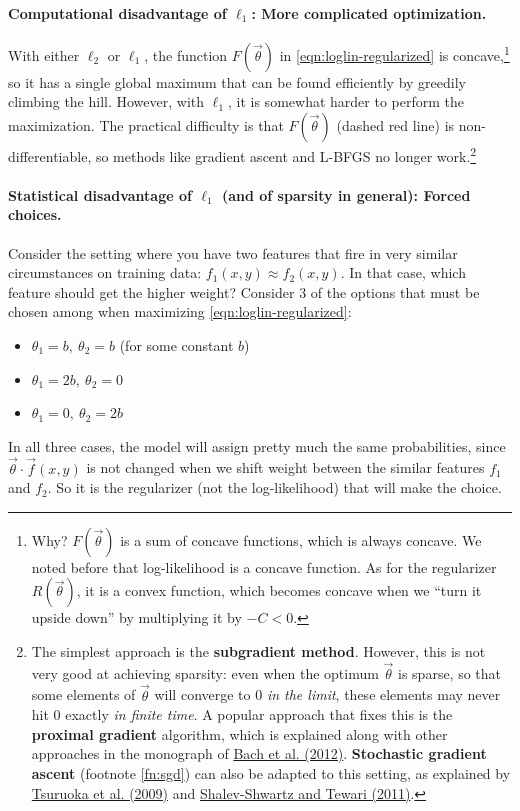 \documentclass[11pt]{article}
\newcommand{\vtheta}{\vec{\theta}}
\begin{document}
\paragraph{Computational disadvantage of $\ell_1$: More complicated optimization.}
With either $\ell_2$ or $\ell_1$, the function $F(\vtheta)$ in \eqref{eqn:loglin-regularized} is concave,\footnote{Why?  $F(\vtheta)$ is a sum of concave functions, which is always concave.  We noted before that log-likelihood is a concave function.  As for the regularizer $R(\vtheta)$, it is a convex function, which becomes concave when we ``turn it upside down'' by multiplying it by $-C < 0$.} so it has a single global maximum that can be found efficiently by greedily climbing the hill.  However, with $\ell_1$, it is somewhat harder to perform the maximization.  The practical difficulty is that $F(\vtheta)$ (dashed red line) is non-differentiable, so methods like gradient ascent and L-BFGS no longer work.\footnote{The simplest approach is the {\bf subgradient method}.  However, this is not very good at achieving sparsity: even when the optimum $\vtheta$ is sparse, so that some elements of $\vtheta$ will converge to 0 {\em in the limit}, these elements may never hit 0 exactly {\em in finite time}.  A popular approach that fixes this is the {\bf proximal gradient} algorithm, which is explained along with other approaches in the monograph of \href{http://www.di.ens.fr/~fbach/bach_jenatton_mairal_obozinski_FOT.pdf}{Bach et al. (2012)}.  {\bf Stochastic gradient ascent} (footnote \ref{fn:sgd}) can also be adapted to this setting, as explained by \href{http://www.aclweb.org/anthology/P09-1054}{Tsuruoka et al. (2009)} and \href{http://www.jmlr.org/papers/volume12/shalev-shwartz11a/shalev-shwartz11a.pdf}{Shalev-Shwartz and Tewari (2011)}.}

\paragraph{Statistical disadvantage of $\ell_1$ (and of sparsity in general): Forced choices.}\label{sec:eggs}
Consider the setting where you have two features that fire in very similar circumstances on training data: $f_1(x,y) \approx f_2(x,y)$.  In that case, which feature should get
the higher weight?  Consider 3 of the options that must be chosen among when maximizing \eqref{eqn:loglin-regularized}:
\begin{itemize}[noitemsep]
\item $\theta_1=b,\ \theta_2=b$  (for some constant $b$)
\item $\theta_1=2b,\ \theta_2=0$
\item $\theta_1=0,\ \theta_2=2b$
\end{itemize}
In all three cases, the model will assign pretty much the same
probabilities, since $\vtheta \cdot \vec{f}(x,y)$ is not changed when
we shift weight between the similar features $f_1$ and $f_2$.  So it
is the regularizer (not the log-likelihood) that will make the choice.
\end{document}
